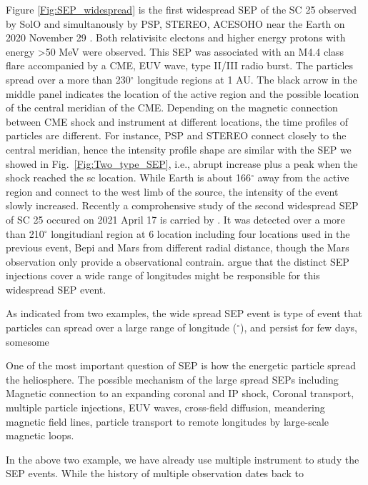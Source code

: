 Figure \ref{Fig:SEP_widespread} is the first widespread \ac{SEP} of the \ac{SC} 25 observed by \ac{SolO} and simultanously by \ac{PSP}, \ac{STEREO}, \ac{ACE}\/\ac{SOHO} near the Earth on 2020 November 29 \citet{Kollhoff2021AA, Kouloumvakos2022, Palmerio2022}. Both relativisitc electons and higher energy protons with energy >50 MeV were observed. This SEP was associated with an M4.4 class flare accompanied by a \ac{CME}, \ac{EUV} wave, type II/III radio burst. The particles spread over a more than 230$^\circ$ longitude regions at 1 AU. The black arrow in the middle panel indicates the location of the active region and the possible location of the central meridian of the \ac{CME}.  Depending on the magnetic connection between \ac{CME} shock and instrument at different locations, the time profiles of particles are different. For instance, \ac{PSP} and \ac{STEREO} connect closely to the central meridian, hence the intensity profile shape are similar with the \ac{SEP} we showed in Fig.~\ref{Fig:Two_type_SEP}, i.e., abrupt increase plus a peak when the shock reached the s\/c location. While Earth is about 166$^\circ$ away from the active region and connect to the west limb of the source, the intensity of the event slowly increased.
Recently a comprohensive study of the second widespread \ac{SEP} of \ac{SC} 25 occured on 2021 April 17 is carried by \citep{dresing202317}. It was detected over a more than 210$^\circ$ longitudianl region at 6 location including four locations used in the previous event, \ac{Bepi} and Mars from different radial distance, though the Mars observation only provide a observational contrain. \citep{dresing202317} argue that the distinct SEP injections cover a wide range of longitudes might be responsible for this widespread SEP event.

As indicated from two examples, the wide spread \ac{SEP} event is type of event that particles can spread over a large range of longitude ($^\circ$), and persist for few days, somesome

One of the most important question of SEP is how the energetic particle spread the heliosphere. The possible mechanism of the large spread SEPs including Magnetic connection to an expanding coronal and IP shock, Coronal transport, multiple particle injections, EUV waves, cross-field diffusion, meandering magnetic field lines, particle transport to remote longitudes by large-scale magnetic loops.

In the above two example, we have already use multiple instrument to study the \ac{SEP} events. While the history of multiple observation dates back to 


